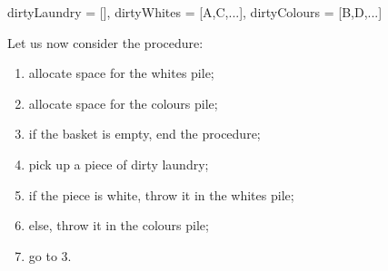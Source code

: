 \begin{codebox}
 { dirtyLaundry = [],
   dirtyWhites = [A,C,...],
   dirtyColours = [B,D,...] }
\end{codebox}

Let us now consider the  procedure: 

\begin{enumerate}

\item allocate space for the whites pile;

\item allocate space for the colours pile;

\item if the basket is empty, end the procedure;

\item pick up a piece of dirty laundry;

\item if the piece is white, throw it in the whites pile;

\item else, throw it in the colours pile;

\item go to 3.

\end{enumerate}
